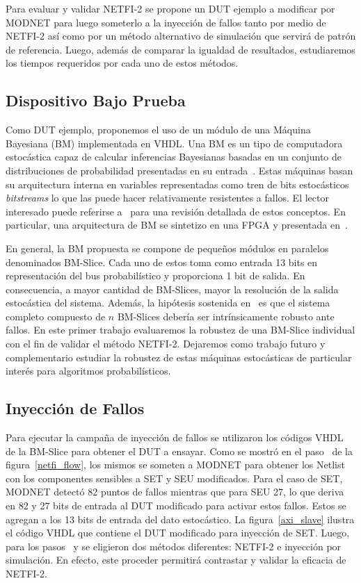 \documentclass[a4paper,openright,12pt]{report}
\newcommand*\circled[1]{\tikz[baseline=(char.base)]{
            \node[shape=circle,draw,inner sep=0.7pt] (char) {#1};}}
\begin{document}
Para evaluar y validar NETFI-2 se propone un DUT ejemplo a modificar por MODNET para luego someterlo a la inyección de fallos tanto por medio de NETFI-2 así como por un método alternativo de simulación que servirá de patrón de referencia. Luego, además de comparar la igualdad de resultados, estudiaremos los tiempos requeridos por cada uno de estos métodos.

\subsection{Dispositivo Bajo Prueba}

Como DUT ejemplo, proponemos el uso de un módulo de una Máquina Bayesiana (BM) implementada en VHDL. Una BM es un tipo de computadora estocástica capaz de calcular inferencias Bayesianas basadas en un conjunto de distribuciones de probabilidad presentadas en su entrada~\cite{Mazer2015}. Estas máquinas basan su arquitectura interna en variables representadas como tren de bits estocásticos \textit{bitstreams} lo que las puede hacer relativamente resistentes a fallos. El lector interesado puede referirse a~\cite{Alaghi2013} para una revisión detallada de estos conceptos. En particular, una arquitectura de BM se sintetizo  en una FPGA y presentada en~\cite{Duarte2015}. 

En general, la BM propuesta se compone de pequeños módulos en paralelos denominados BM-Slice. Cada uno de estos toma como entrada 13 bits en representación del bus probabilístico y proporciona 1 bit de salida. En consecuencia, a mayor cantidad de BM-Slices, mayor la resolución de la salida estocástica del sistema. Además, la hipótesis sostenida en~\cite{Mazer2015} es que el sistema completo compuesto de $n$ BM-Slices debería ser intrínsicamente robusto ante fallos. En este primer trabajo evaluaremos la robustez de una BM-Slice individual con el fin de validar el método NETFI-2. Dejaremos como trabajo futuro y complementario estudiar la robustez de estas máquinas estocásticas de particular interés para algoritmos probabilísticos.

\subsection{Inyección de Fallos}

Para ejecutar la campaña de inyección de fallos se utilizaron los códigos VHDL de la BM-Slice para obtener el DUT a ensayar. Como se mostró en el paso~\circled{2} de la figura~\ref{netfi_flow}, los mismos se someten a MODNET para obtener los Netlist con los componentes sensibles a SET y SEU modificados. Para el caso de SET, MODNET detectó 82 puntos de fallos mientras que para SEU 27, lo que deriva en 82 y 27 bits de entrada al DUT modificado para activar estos fallos. Estos se agregan a los 13 bits de entrada del dato estocástico. La figura~\ref{axi_slave} ilustra el código VHDL que contiene el DUT modificado para inyección de SET. Luego, para los pasos~\circled{3} y \circled{4} se eligieron dos métodos diferentes: NETFI-2 e inyección por simulación. En efecto, este proceder permitirá contrastar y validar la eficacia de NETFI-2.
\end{document}
